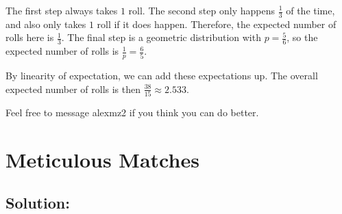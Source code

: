 \documentclass{article}
\begin{document}
The first step always takes $1$ roll. The second step only happens $\frac{1}{3}$ of the time, and also only takes $1$ roll if it does happen. Therefore, the expected number of rolls here is $\frac{1}{3}$. The final step is a geometric distribution with $p = \frac{5}{6}$, so the expected number of rolls is $\frac{1}{p} = \frac{6}{5}$.

By linearity of expectation, we can add these expectations up. The overall expected number of rolls is then $\boxed{\frac{38}{15} \approx 2.533}$.

Feel free to message alexmz2 if you think you can do better.

\vfill\newpage

\section{Meticulous Matches}

\subsection{Solution:}
\end{document}
